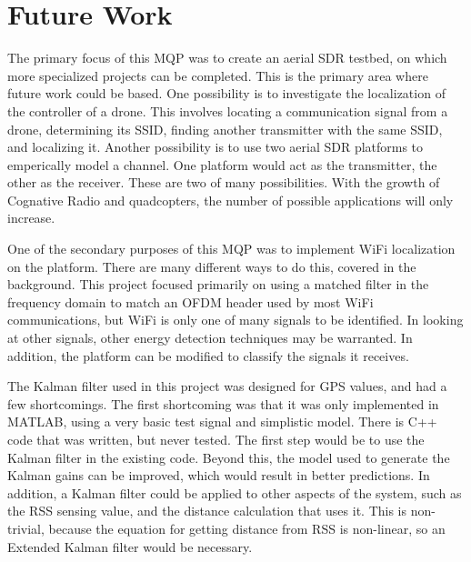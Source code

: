 \section{Future Work}
The primary focus of this MQP was to create an aerial SDR testbed, on which more 
specialized projects can be completed. This is the primary area where future work
could be based. One possibility is to investigate the localization of the controller
of a drone. This involves locating a communication signal from a drone, determining its
SSID, finding another transmitter with the same SSID, and localizing it. Another possibility
is to use two aerial SDR platforms to emperically model a channel. One platform
would act as the transmitter, the other as the receiver. These are two of many possibilities.
With the growth of Cognative Radio and quadcopters, the number of possible applications
will only increase.\par

One of the secondary purposes of this MQP was to implement WiFi localization on 
the platform. There are many different ways to do this, covered in the background.
This project focused primarily on using a matched filter in the frequency domain to match
an OFDM header used by most WiFi communications, but WiFi is only one of many 
signals to be identified. In looking at other signals, other energy detection
techniques may be warranted. In addition, the platform can be modified to 
classify the signals it receives.\par

The Kalman filter used in this project was designed for GPS values, and had a few shortcomings.
The first shortcoming was that it was only implemented in MATLAB, using a very basic
test signal and simplistic model. There is C++ code that was written, but never tested.
The first step would be to use the Kalman filter in the existing code. Beyond this,
the model used to generate the Kalman gains can be improved, which would result in better 
predictions. In addition, a Kalman filter could be applied to other aspects of the 
system, such as the RSS sensing value, and the distance calculation that uses it.
This is non-trivial, because the equation for getting distance from RSS is non-linear,
so an Extended Kalman filter would be necessary. 
